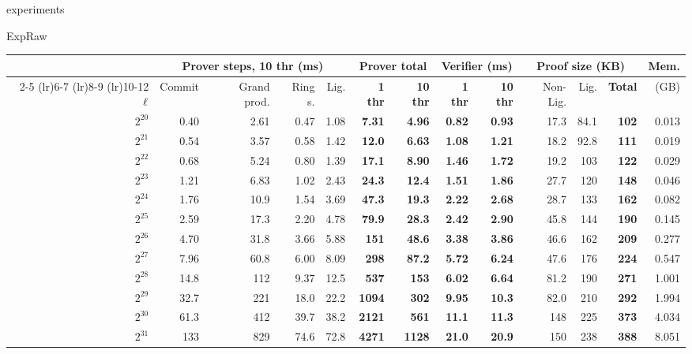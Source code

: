 \begin{lncsappendix}{experiments}
\begin{lncsmove}{ExpRaw}
\begin{table}[H]
  \centering
  \footnotesize
  \setlength{\tabcolsep}{2pt}
  \begin{tabular}{@{}rrrrr>{\bfseries}r>{\bfseries}r>{\bfseries}r>{\bfseries}rrr>{\bfseries}rr@{}}
    \toprule
    & \multicolumn{4}{c}{Prover steps, 10 thr (ms)} & \multicolumn{2}{c}{Prover total} & \multicolumn{2}{c}{Verifier (ms)} & \multicolumn{3}{c}{Proof size (KB)} & Mem. \\
    \cmidrule(lr){2-5} \cmidrule(lr){6-7} \cmidrule(lr){8-9} \cmidrule(lr){10-12}
    $\ell$ & Commit & Grand prod. & Ring s. & Lig. & 1 thr & 10 thr & 1 thr & 10 thr & Non-Lig. & Lig. & Total & (GB) \\
    \midrule
    $2^{20}$ & 0.40 & 2.61 & 0.47 & 1.08 & 7.31 & 4.96 & 0.82 & 0.93 & 17.3 & 84.1 & 102 & 0.013 \\
    $2^{21}$ & 0.54 & 3.57 & 0.58 & 1.42 & 12.0 & 6.63 & 1.08 & 1.21 & 18.2 & 92.8 & 111 & 0.019 \\
    $2^{22}$ & 0.68 & 5.24 & 0.80 & 1.39 & 17.1 & 8.90 & 1.46 & 1.72 & 19.2 & 103 & 122 & 0.029 \\
    $2^{23}$ & 1.21 & 6.83 & 1.02 & 2.43 & 24.3 & 12.4 & 1.51 & 1.86 & 27.7 & 120 & 148 & 0.046 \\
    $2^{24}$ & 1.76 & 10.9 & 1.54 & 3.69 & 47.3 & 19.3 & 2.22 & 2.68 & 28.7 & 133 & 162 & 0.082 \\
    $2^{25}$ & 2.59 & 17.3 & 2.20 & 4.78 & 79.9 & 28.3 & 2.42 & 2.90 & 45.8 & 144 & 190 & 0.145 \\
    $2^{26}$ & 4.70 & 31.8 & 3.66 & 5.88 & 151 & 48.6 & 3.38 & 3.86 & 46.6 & 162 & 209 & 0.277 \\
    $2^{27}$ & 7.96 & 60.8 & 6.00 & 8.09 & 298 & 87.2 & 5.72 & 6.24 & 47.6 & 176 & 224 & 0.547 \\
    $2^{28}$ & 14.8 & 112 & 9.37 & 12.5 & 537 & 153 & 6.02 & 6.64 & 81.2 & 190 & 271 & 1.001 \\
    $2^{29}$ & 32.7 & 221 & 18.0 & 22.2 & 1094 & 302 & 9.95 & 10.3 & 82.0 & 210 & 292 & 1.994 \\
    $2^{30}$ & 61.3 & 412 & 39.7 & 38.2 & 2121 & 561 & 11.1 & 11.3 & 148 & 225 & 373 & 4.034 \\
    $2^{31}$ & 133 & 829 & 74.6 & 72.8 & 4271 & 1128 & 21.0 & 20.9 & 150 & 238 & 388 & 8.051 \\
    \bottomrule
  \end{tabular}

\end{table}
\end{lncsmove}
\end{lncsappendix}
